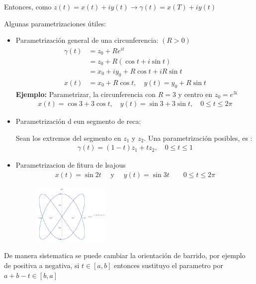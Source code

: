 \documentclass{article}
\begin{document}
Entonces, como $ z(t) = x(t) + i y (t)  \rightarrow  \gamma(t) = x(T) + i y (t) $

Algunas parametrizaciones útiles: 
\begin{itemize}
  \item Parametrización general de una circunferencia: $ (R>0 ) $
    \begin{align*}
      \gamma(t) &= z_0 + R e  ^ {i t } \\
           &= z_0 + R(\cos{t } + i \sin{t })\\
           &= x_0+iy_0 + R \cos{t } + i R \sin{t }\\
      x(t) &= x_0 + R \cos{t },\quad  y(t) = y_0 + R \sin{t }
    \end{align*}
    \textbf{Ejemplo: }Parametrizar, la circunferencia con $ R=3  $ y centro en $ z_0 = e ^ {3i } $
    \begin{gather*}
      x(t) = \cos{3 } + 3 \cos{t }, \quad y(t) = \sin{3 } + 3 \sin{t } , \quad 0 \leq t \leq 2\pi
    \end{gather*}
  \item Parametrización d eun segmento de reca: 

    Sean los extremos del segmento en $ z_1  $ y $ z_2  $. Una parametrización posibles, es : 
    \begin{gather*}
      \gamma(t) = (1-t)z_1 + t z_2 ,\quad 0\leq t \leq 1  
    \end{gather*}
  \item Parametrizacion de fitura de lsajous
    \begin{gather*}
      x(t) = \sin{2t } \quad \text{ y } \quad y(t) = \sin{3t } \qquad 0\leq t \leq 2 \pi 
    \end{gather*}
    \begin{figure}[H]
      \begin{center}
        \includegraphics[width=0.35\textwidth]{lisajous.png}
      \end{center}
    \end{figure}
\end{itemize}

De manera sistematica se puede cambiar la orientación de barrido, por ejemplo de positiva a negativa, si $ t\in [a,b] $ entonces sustituyo el parametro por $ a + b - t \in [b,a] $
\end{document}

